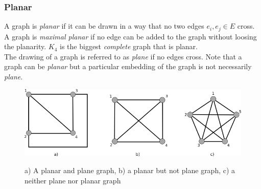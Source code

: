 \subsubsection{Planar}
A graph is \textit{planar} if it can be drawn in a way that no two edges $e_i, e_j \in E$ cross. \\
A graph is \textit{maximal planar} if no edge can be added to the graph without loosing the planarity. $K_4$ is the biggest \textit{complete} graph that is planar.\\
The drawing of a graph is referred to as \textit{plane} if no edges cross. Note that a graph can be \textit{planar} but a particular embedding of the graph is not necessarily \textit{plane}.
\begin{figure}[h!]
\includegraphics[width =\textwidth]{figures/PlanarPlaneGraphs.png}
\label{PPG}
\caption{a) A planar and plane graph, b) a planar but not plane graph, c) a neither plane nor planar graph}
\end{figure}
\newpage
